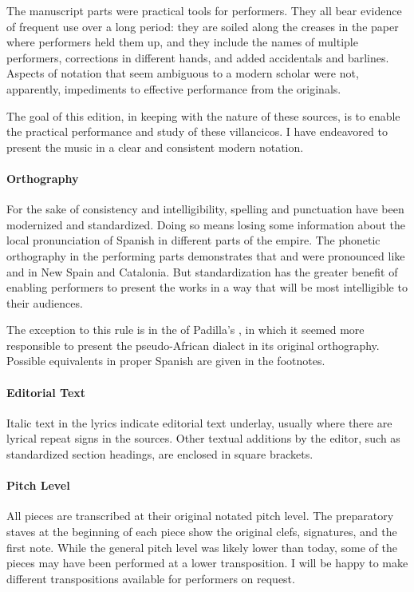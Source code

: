 The manuscript parts were practical tools for performers.
They all bear evidence of frequent use over a long period: they are soiled along the creases in the paper where performers held them up, and they include the names of multiple performers, corrections in different hands, and added accidentals and barlines.
Aspects of notation that seem ambiguous to a modern scholar were not, apparently, impediments to effective performance from the originals.

The goal of this edition, in keeping with the nature of these sources, is to enable the practical performance and study of these villancicos.
I have endeavored to present the music in a clear and consistent modern notation.


\paragraph{Orthography}
For the sake of consistency and intelligibility, spelling and punctuation have been modernized and standardized.
Doing so means losing some information about the local pronunciation of Spanish in different parts of the empire.
The phonetic orthography in the performing parts demonstrates that  and  were pronounced like  and  in New Spain and Catalonia.
But standardization has the greater benefit of enabling performers to present the works in a way that will be most intelligible to their audiences.

The exception to this rule is in the  of Padilla's , in which it seemed more responsible to present the pseudo-African dialect in its original orthography.
Possible equivalents in proper Spanish are given in the footnotes.

\paragraph{Editorial Text}
Italic text in the lyrics indicate editorial text underlay, usually where there are lyrical repeat signs in the sources.
Other textual additions by the editor, such as standardized section headings, are enclosed in square brackets.

\paragraph{Pitch Level}
All pieces are transcribed at their original notated pitch level.
The preparatory staves at the beginning of each piece show the original clefs, signatures, and the first note.
While the  general pitch level was likely lower than today, some of the pieces may have been performed at a lower transposition.
I will be happy to make different transpositions available for performers on request.

